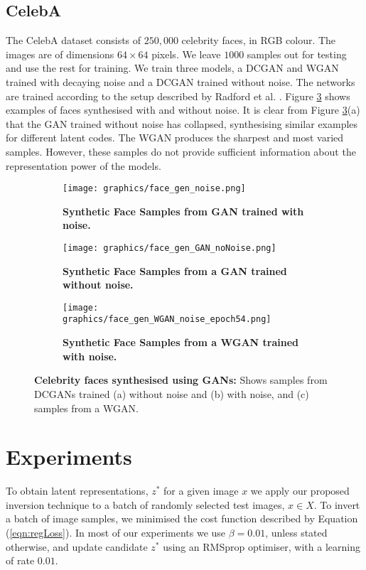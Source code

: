 \documentclass[journal]{IEEEtran}
\begin{document}
\subsection{CelebA}
The CelebA dataset consists of $250,000$ celebrity faces, in RGB colour. The images are of dimensions $64\times64$ pixels. We leave $1000$ samples out for testing and use the rest for training. We train three models, a DCGAN and WGAN trained with decaying noise \cite{arjovsky2017towards} and a DCGAN trained without noise. The networks are trained according to the setup described by Radford et al. \cite{radford2015unsupervised}. Figure \ref{fig:face_gen} shows examples of faces synthesised with and without noise. It is clear from Figure \ref{fig:face_gen}(a) that the GAN trained without noise has collapsed, synthesising similar examples for different latent codes. The WGAN produces the sharpest and most varied samples. However, these samples do not provide sufficient information about the representation power of the models.

\begin{figure}
\begin{subfigure}{\columnwidth}
    \centering
    \texttt{[image: graphics/face\_gen\_noise.png]} %
    \caption{\textbf{Synthetic Face Samples from GAN trained with noise.}}
    \label{fig:my_label}
\end{subfigure}
\begin{subfigure}{\columnwidth}
    \centering
    \texttt{[image: graphics/face\_gen\_GAN\_noNoise.png]} %
    \caption{\textbf{Synthetic Face Samples from a GAN trained without noise.}}
    \label{fig:my_label}
\end{subfigure}
\begin{subfigure}{\columnwidth}
    \centering
    \texttt{[image: graphics/face\_gen\_WGAN\_noise\_epoch54.png]} %
    \caption{\textbf{Synthetic Face Samples from a WGAN trained with noise.}}
    \label{fig:face_gen}
\end{subfigure}
\caption{\textbf{Celebrity faces synthesised using GANs:} Shows samples from DCGANs trained (a) without noise and (b) with noise, and (c) samples from a WGAN.}
\label{fig:shoe_gen}
\end{figure}


\section{Experiments}
\label{sec:experiments}
To obtain latent representations, $z^*$ for a given image $x$ we apply our proposed inversion technique to a batch of randomly selected test images, $x \in X$. To invert a batch of image samples, we minimised the cost function described by Equation (\ref{eqn:regLoss}). In most of our experiments we use $\beta=0.01$, unless stated otherwise, and update candidate $z^*$ using an RMSprop optimiser, with a learning of rate $0.01$.
\end{document}
